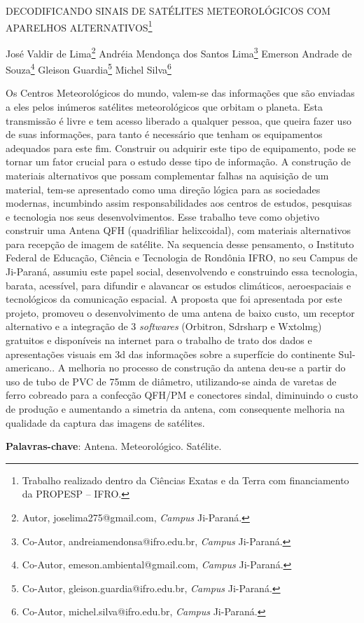 \documentclass[article,12pt,onesidea,4paper,english,brazil]{abntex2}
\begin{document}
	
	
	\frenchspacing 
	
	\begin{center}
		\LARGE DECODIFICANDO SINAIS DE SATÉLITES METEOROLÓGICOS COM APARELHOS ALTERNATIVOS\footnote{Trabalho realizado dentro da Ciências Exatas e da Terra com financiamento da PROPESP – IFRO.}
		
		\normalsize
		José Valdir de Lima\footnote{Autor, joselima275@gmail.com, \textit{Campus} Ji-Paraná.} 
		Andréia Mendonça dos Santos Lima\footnote{Co-Autor, andreiamendonsa@ifro.edu.br, \textit{Campus} Ji-Paraná.} 
		Emerson Andrade de Souza\footnote{Co-Autor, emeson.ambiental@gmail.com, \textit{Campus} Ji-Paraná.} 
		Gleison Guardia\footnote{Co-Autor, gleison.guardia@ifro.edu.br, \textit{Campus} Ji-Paraná.}
		Michel Silva\footnote{Co-Autor, michel.silva@ifro.edu.br, \textit{Campus} Ji-Paraná.} 
	\end{center}
	
	\noindent Os Centros Meteorológicos do mundo, valem-se das informações que são enviadas
	a eles pelos inúmeros satélites meteorológicos que orbitam o planeta. Esta
	transmissão é livre e tem acesso liberado a qualquer pessoa, que queira fazer uso
	de suas informações, para tanto é necessário que tenham os equipamentos
	adequados para este fim. Construir ou adquirir este tipo de equipamento, pode se
	tornar um fator crucial para o estudo desse tipo de informação. A construção de
	materiais alternativos que possam complementar falhas na aquisição de um
	material, tem-se apresentado como uma direção lógica para as sociedades
	modernas, incumbindo assim responsabilidades aos centros de estudos, pesquisas
	e tecnologia nos seus desenvolvimentos. Esse trabalho teve como objetivo construir
	uma Antena QFH (quadrifiliar helixcoidal), com materiais alternativos para recepção
	de imagem de satélite. Na sequencia desse pensamento, o Instituto Federal de
	Educação, Ciência e Tecnologia de Rondônia IFRO, no seu Campus de Ji-Paraná,
	assumiu este papel social, desenvolvendo e construindo essa tecnologia, barata,
	acessível, para difundir e alavancar os estudos climáticos, aeroespaciais e
	tecnológicos da comunicação espacial. A proposta que foi apresentada por este
	projeto, promoveu o desenvolvimento de uma antena de baixo custo, um receptor
	alternativo e a integração de 3 \textit{softwares} (Orbitron, Sdrsharp e Wxtolmg) gratuitos e
	disponíveis na internet para o trabalho de trato dos dados e apresentações visuais
	em 3d das informações sobre a superfície do continente Sul-americano.. A melhoria
	no processo de construção da antena deu-se a partir do uso de tubo de PVC de
	75mm de diâmetro, utilizando-se ainda de varetas de ferro cobreado para a
	confecção QFH/PM e conectores sindal, diminuindo o custo de produção e
	aumentando a simetria da antena, com consequente melhoria na qualidade da
	captura das imagens de satélites.
	
	\vspace{\onelineskip}
	
	\noindent
	\textbf{Palavras-chave}: Antena. Meteorológico. Satélite.
	
\end{document}
